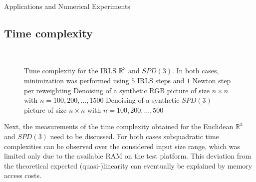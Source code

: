 \begin{chapter}{Applications and Numerical Experiments}
\subsection{Time complexity}
\label{sub:TimeComplexity}
\begin{figure}[h!]
    \centering
    \\
    \caption[Time complexity IRLS $\mathbb{R}^3$ and $SPD(3)$]{Time complexity for the IRLS $\mathbb{R}^3$ and $SPD(3)$. In both cases, minimization was performed using $5$ IRLS steps and $1$ Newton step per
    reweighting
	 Denoising of a synthetic RGB picture of size $n\times n$ with $n=100, 200, \ldots, 1500$
	 Denoising of a synthetic $SPD(3)$ picture of size $n\times n$ with $n=100, 200, \ldots, 500$
	\label{fig:complexity}
    }
\end{figure}
Next, the measurements of the time complexity obtained for the Euclidean $\mathbb{R}^3$ and $SPD(3)$ need to be discussed. 
For both cases subquadratic time complexities can be observed over the considered input size range, which was limited only due to the available RAM on the test platform. This deviation from the theoretical
expected (quasi-)linearity can eventually be explained by memory access costs.


\end{chapter}
